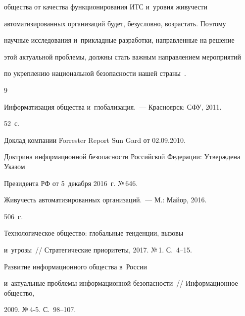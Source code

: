общества от качества функционирования ИТС и~уровня живучести 


автоматизированных организаций будет, безусловно, возрастать. Поэтому 


научные исследования и~прикладные разработки, направленные на решение 


этой актуальной проблемы, должны стать важным направлением мероприятий 


по укреплению национальной безопасности нашей страны~\cite{6-bys}.


  


  


 {\small\frenchspacing


{%




\begin{thebibliography}{9}




   Информатизация общества и~глобализация.~--- Красноярск: СФУ, 2011. 


52~с.




  Доклад компании Forrester Report Sun Gard от 02.09.2010.




  Доктрина информационной безопасности Российской Федерации: Утверждена Указом 


Президента РФ от 5~декабря 2016~г. №\,646.




   Живучесть автоматизированных организаций.~--- М.: Майор, 2016. 


506~с.




   Технологическое общество: глобальные тенденции, вызовы 


  и~угрозы~/\!\!/ Стратегические приоритеты, 2017. №\,1. С.~4--15.




   Развитие информационного общества в~России 


и~актуальные проблемы информационной безопасности~/\!\!/ Информационное общество, 


2009. №\,4-5. С.~98--107.


        \end{thebibliography}


} }








